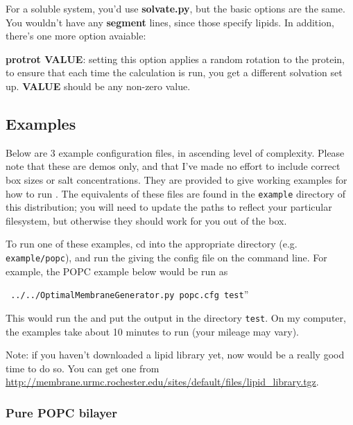 \documentclass[12pt]{article}
\begin{document}
For a soluble system, you'd use {\bf solvate.py}, but the basic options are the same.  You wouldn't have any {\bf segment} lines, since those specify lipids.  In addition, there's one more option avaiable:

{\bf protrot VALUE}: setting this option applies a random rotation to the protein, to ensure that each time the calculation is run, you get a different solvation set up.  {\bf VALUE} should be any non-zero value.

\subsection{Examples}
\label{ss:examples}

Below are 3 example configuration files, in ascending level of complexity.
Please note that these are demos only, and that I've made no effort to
include correct box sizes or salt concentrations.  They are provided to
give working examples for how to run \omgwtf.  The equivalents of these
files are found in the {\tt example} directory of this distribution; you
will need to update the paths to reflect your particular filesystem, but
otherwise they should work for you out of the box.

To run one of these examples, cd into the appropriate directory (e.g. {\tt
example/popc}), and run the {\omgwtf} giving the config file on the command
line.  For example, the POPC example below would be run as

{\tt
../../OptimalMembraneGenerator.py popc.cfg test}''

This would run the
{\omgwtf} and put the output in the directory {\tt test}.  On my computer,
the examples take about 10 minutes to run (your mileage may vary).

Note: if you haven't downloaded a lipid library yet, now would be a really
good time to do so.  You can get one from
\url{http://membrane.urmc.rochester.edu/sites/default/files/lipid_library.tgz}.


\subsubsection{Pure POPC bilayer}
\end{document}
